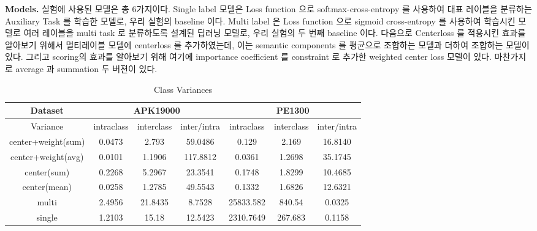 \textbf{Models. }
실험에 사용된 모델은 총 6가지이다. Single label 모델은 Loss function 으로 softmax-cross-entropy 를 사용하여 대표 레이블을 분류하는 Auxiliary Task 를 학습한 모델로, 우리 실험의 baseline 이다. Multi label 은  Loss function 으로 sigmoid cross-entropy 를 사용하여 학습시킨 모델로 여러 레이블을 multi task 로 분류하도록 설계된 딥러닝 모델로, 우리 실험의 두 번째 baseline 이다. 다음으로 Centerloss 를 적용시킨 효과를 알아보기 위해서 멀티레이블 모델에 centerloss 를 추가하였는데, 이는 semantic components 를 평균으로 조합하는 모델과 더하여 조합하는 모델이 있다. 그리고 scoring의 효과를 알아보기 위해 여기에 importance coefficient 를 constraint 로 추가한 weighted center loss 모델이 있다. 마찬가지로 average 과 summation 두 버젼이 있다. 

\begin{table*}[!htb]%
\caption{Class Variances}
\label{tab:class_variances}
\begin{minipage}{\textwidth}
\begin{center}
\begin{tabular}{|c|c|c|c|c|c|c|}
\hline
Dataset             & \multicolumn{3}{c|}{APK19000}                               & \multicolumn{3}{c|}{PE1300}                                             \\ \hline
Variance              & intraclass  & interclass  & inter/intra & intraclass  & interclass  & inter/intra  \\ \hline
center+weight(sum)  & 0.0473              &         2.793       &     59.0486             & 0.129               &              2.169 &              16.8140    \\ \hline
center+weight(avg) & 0.0101              &              1.1906 &    117.8812             & 0.0361              &                    1.2698 &      35.1745                   \\ \hline
center(sum)         & 0.2268              &                    5.2967 &          23.3541               & 0.1748              &              1.8299       &    10.4685                     \\ \hline
center(mean)        & 0.0258              &                    1.2785 &           49.5543              & 0.1332              &        1.6826             &     12.6321                    \\ \hline
multi               & 2.4956              &                    21.8435 &       8.7528                    & 25833.582           &        840.54             &        0.0325               \\ \hline
single              & 1.2103              &                    15.18 &            12.5423             & 2310.7649           &      267.683               &           0.1158              \\ \hline
\end{tabular}
\end{center}
\bigskip\centering
\end{minipage}
\end{table*}%


